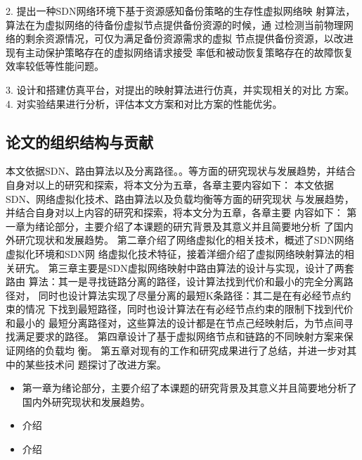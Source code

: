 2.	提出一种SDN网络环境下基于资源感知备份策略的生存性虚拟网络映 射算法，算法在为虚拟网络的待备份虚拟节点提供备份资源的时候，通 过检测当前物理网络的剩余资源情况，可仅为满足备份资源需求的虚拟 节点提供备份资源，以改进现有主动保护策略存在的虚拟网络请求接受 率低和被动恢复策略存在的故障恢复效率较低等性能问题。

3.	设计和搭建仿真平台，对提出的映射算法进行仿真，并实现相关的对比 方案。
4.	对实验结果进行分析，评估本文方案和对比方案的性能优劣。


\subsection{论文的组织结构与贡献}
本文依据SDN、路由算法以及分离路径。。等方面的研究现状与发展趋势，并结合自身对以上的研究和探索，将本文分为五章，各章主要内容如下：
本文依据SDN、网络虚拟化技术、路由算法以及负载均衡等方面的研究现状 与发展趋势，并结合自身对以上内容的研究和探索，将本文分为五章，各章主要 内容如下：
第一章为绪论部分，主要介绍了本课题的研宄背景及其意义并且简要地分析 了国内外研宂现状和发展趋势。
第二章介绍了网络虚拟化的相关技术，概述了SDN网络虚拟化环境和SDN网 络虚拟化技术特征，接着洋细介绍了虚拟网络映射算法的相关研宄。
第三章主要是SDN虚拟网络映射中路由算法的设计与实现，设计了两套路由 算法：其一是寻找链路分离的路径，设计算法找到代价和最小的完全分离路径对， 同时也设计算法实现了尽量分离的最短K条路径：其二是在有必经节点约束的情况 下找到最短路径，同时也设计算法在有必经节点约束的限制下找到代价和最小的 最短分离路径对，这些算法的设计都是在节点己经映射后，为节点间寻找满足要求的路径。
第四章设计了基于虚拟网络节点和链路的不同映射方案来保证网络的负载均 衡。
第五章对现有的工作和研究成果进行了总结，并进一步对其中的某些技术问 题探讨了改进方案。
\begin{itemize}
  \item 第一章为绪论部分，主要介绍了本课题的研究背景及其意义并且简要地分析了国内外研究现状和发展趋势。
  \item 介绍
  \item 介绍
\end{itemize}

